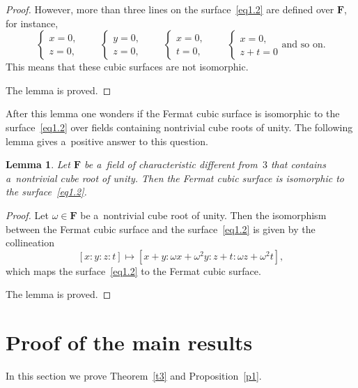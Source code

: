 \documentclass{amsart}
\numberwithin{equation}{section}
\theoremstyle{plain}
\newtheorem{lemma}{Lemma}
\theoremstyle{definition}
\theoremstyle{remark}
\begin{document}
\begin{proof}
However, more than three lines on the surface~\eqref{eq1.2} are defined over $\mathbf{F}$, for instance,
$$
\begin{cases}
x=0,\\
z=0,
\end{cases}
\qquad
\begin{cases}
y=0,\\
z=0,
\end{cases}
\qquad
\begin{cases}
x=0,\\
t=0,
\end{cases}
\qquad
\begin{cases}
x=0,\\
z+t=0
\end{cases} \text{and so on}.
$$
This means that these cubic surfaces are not isomorphic.

The lemma is proved.
\end{proof}

After this lemma one wonders if the Fermat cubic surface is isomorphic to the surface~\eqref{eq1.2} over fields containing nontrivial cube roots of unity. The following lemma gives a~positive answer to this question.

\begin{lemma}
\label{l56}
Let $\mathbf{F}$ be a~field of characteristic different from~$3$ that contains a~nontrivial cube root of unity. Then the Fermat cubic surface is isomorphic to the surface~\eqref{eq1.2}.
\end{lemma}

\begin{proof}
Let $\omega \in \mathbf{F}$ be a~nontrivial cube root of unity. Then the isomorphism between the Fermat cubic surface and the surface~\eqref{eq1.2} is given by the collineation
$$
[x:y:z:t] \mapsto [x+y:\omega x+\omega^2 y:z+t:\omega z+\omega^2 t],
$$
which maps the surface~\eqref{eq1.2} to the Fermat cubic surface.

The lemma is proved.
\end{proof}


\section{Proof of the main results}
\label{s8}

In this section we prove Theorem~\ref{t3} and Proposition~\ref{p1}.
\end{document}
